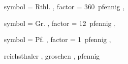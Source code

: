 
 {
	symbol = { Rthl. } ,
	factor = { 360~pfennig } ,
}

 {
	symbol = { Gr. } ,
	factor = { 12~pfennig } ,
}

 {
	symbol = { Pf. } ,
	factor = { 1~pfennig } ,
}

 {
	reichsthaler ,
	groschen ,
	pfennig
}